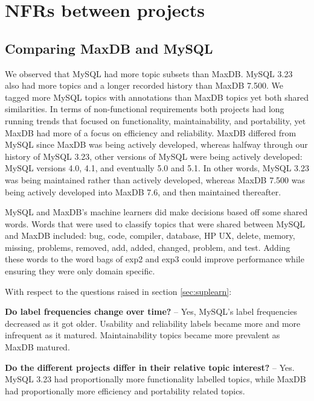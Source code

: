 \documentclass[]{sig-alternate}
\newcommand{\XXX}[1]{\textcolor{red}{{\it \textbf{[XXX: #1]}}}}
\begin{document}
\section{NFRs between projects}

\subsection{Comparing MaxDB and MySQL}

\label{sec:comparison}

We observed that MySQL had more topic subsets than MaxDB. MySQL 3.23 also had more topics and a longer recorded history than MaxDB 7.500. We tagged more MySQL topics with annotations than MaxDB topics yet both shared similarities. In terms of non-functional requirements both projects had long running trends that focused on functionality, maintainability, and portability, yet MaxDB had more of a focus on efficiency and reliability. MaxDB differed from MySQL since MaxDB was being actively developed, whereas halfway through our history of MySQL 3.23, other versions of MySQL were being actively developed: MySQL versions 4.0, 4.1, and eventually 5.0 and 5.1. In other words, MySQL 3.23 was being maintained rather than actively developed, whereas MaxDB 7.500 was being actively developed into MaxDB 7.6, and then maintained thereafter.

MySQL and MaxDB's machine learners did make decisions based off some shared words. Words that were used to classify topics that were shared between MySQL and MaxDB included: \textsf{bug, code, compiler, database, HP UX, delete, memory, missing, problems, removed, add, added, changed, problem, and test}. Adding these words to the word bags of \textsf{exp2} and \textsf{exp3} could improve performance while ensuring they were only domain specific.

With respect to the questions raised in section \ref{sec:suplearn}:

\textbf{Do label frequencies change over time?} -- Yes, MySQL's label
frequencies decreased as it got older. Usability and reliability
labels became more and more infrequent as it matured. Maintainability topics
became more prevalent as MaxDB matured.

\textbf{Do the different projects differ in their relative topic
  interest?} -- Yes. MySQL 3.23 had proportionally more
functionality labelled topics, while MaxDB had proportionally more
efficiency and portability related topics.
 
\end{document}
